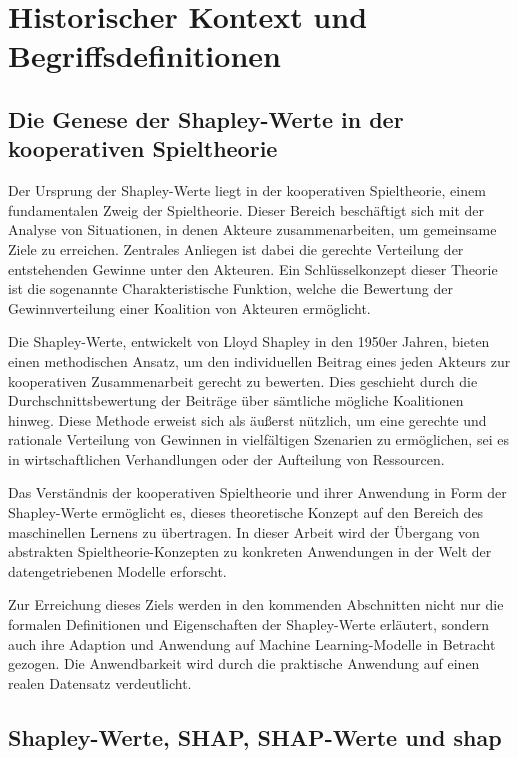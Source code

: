 \chapter{Historischer Kontext und Begriffsdefinitionen}



\section{Die Genese der Shapley-Werte in der kooperativen Spieltheorie}

Der Ursprung der Shapley-Werte liegt in der kooperativen Spieltheorie, einem fundamentalen Zweig der Spieltheorie. 
Dieser Bereich beschäftigt sich mit der Analyse von Situationen, in denen Akteure zusammenarbeiten, um gemeinsame Ziele zu erreichen. 
Zentrales Anliegen ist dabei die gerechte Verteilung der entstehenden Gewinne unter den Akteuren. Ein Schlüsselkonzept dieser Theorie 
ist die sogenannte \glqq{}Charakteristische Funktion\grqq{}, welche die Bewertung der Gewinnverteilung einer Koalition von Akteuren ermöglicht.

Die Shapley-Werte, entwickelt von Lloyd Shapley in den 1950er Jahren, bieten einen methodischen Ansatz, um den individuellen Beitrag 
eines jeden Akteurs zur kooperativen Zusammenarbeit gerecht zu bewerten. Dies geschieht durch die Durchschnittsbewertung der Beiträge 
über sämtliche mögliche Koalitionen hinweg. Diese Methode erweist sich als äußerst nützlich, um eine gerechte und rationale Verteilung 
von Gewinnen in vielfältigen Szenarien zu ermöglichen, sei es in wirtschaftlichen Verhandlungen oder der Aufteilung von Ressourcen.

Das Verständnis der kooperativen Spieltheorie und ihrer Anwendung in Form der Shapley-Werte ermöglicht es, dieses theoretische Konzept 
auf den Bereich des maschinellen Lernens zu übertragen. In dieser Arbeit wird der Übergang von abstrakten Spieltheorie-Konzepten 
zu konkreten Anwendungen in der Welt der datengetriebenen Modelle erforscht.

Zur Erreichung dieses Ziels werden in den kommenden Abschnitten nicht nur die formalen Definitionen und Eigenschaften der Shapley-Werte 
erläutert, sondern auch ihre Adaption und Anwendung auf Machine Learning-Modelle in Betracht gezogen. Die Anwendbarkeit wird durch die 
praktische Anwendung auf einen realen Datensatz verdeutlicht.


\section{Shapley-Werte, \acs{SHAP}, \acs{SHAP}-Werte und \textsf{shap}}

